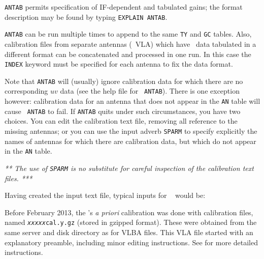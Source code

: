 {\tt ANTAB} permits specification of IF-dependent and tabulated gains;
the format description may be found by typing {\tt EXPLAIN ANTAB}\@.

{\tt ANTAB} can be run multiple times to append to the same {\tt TY}
and {\tt GC} tables. Also, calibration files from separate antennas
(\eg\ VLA) which have \Tsys\ data tabulated in a different
format can be concatenated and processed in one run. In this case the
{\tt INDEX} keyword must be specified for each antenna to fix the data
format.

Note that {\tt ANTAB} will (usually) ignore calibration data for which
there are no corresponding $uv$ data (see the help file for {\tt
ANTAB})\@.  There is one exception however: calibration data for an
antenna that does not appear in the {\tt AN} table will cause {\tt
ANTAB} to fail.  If {\tt ANTAB} quits under such circumstances, you
have two choices.  You can edit the calibration text file, removing
all reference to the missing antennas; or you can use the input adverb
{\tt SPARM} to specify explicitly the names of antennas for which
there are calibration data, but which do not appear in the {\tt AN}
table.

{\it *** The use of {\tt SPARM} is no substitute for careful
inspection of the calibration text files. ***}

Having created the input text file, typical inputs for {\tt
{}} would be:


Before February 2013, the 's {\it a priori} calibration was
done with calibration files, named {\tt{\it xxxxx\/}cal.y.gz} (stored
in gzipped format).  These were obtained from the same server and disk
directory as for VLBA files.  This VLA file started with an
explanatory preamble, including minor editing instructions.  See
 for more detailed instructions.

